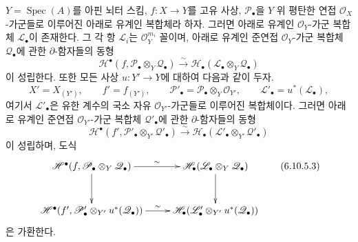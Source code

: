 \begin{theorem}[6.10.5]
\label{III.6.10.5-fr}
$Y=\operatorname{Spec}(A)$를 아핀 뇌터 스킴,
$f:X\to Y$를 고유 사상, $\mathscr P_\bullet$을 $Y$ 위 평탄한 연접
$\mathscr O_X$-가군들로 이루어진 아래로 유계인 복합체라 하자.
그러면 아래로 유계인 $\mathscr O_Y$-가군 복합체
$\mathscr L_\bullet$이 존재한다. 그 각 항 $\mathscr L_i$는
$\mathscr O_Y^{m_i}$ 꼴이며, 아래로 유계인 준연접
$\mathscr O_Y$-가군 복합체 $\mathscr Q_\bullet$에 관한
$\partial$-함자들의 동형
\[
  \mathscr H^\bullet
  (f,\mathscr P_\bullet\otimes_Y\mathscr Q_\bullet)
  \xrightarrow{\sim}
  \mathscr H_\bullet
  (\mathscr L_\bullet\otimes_Y\mathscr Q_\bullet)
  \tag{6.10.5.1}\label{III.6.10.5.1.fr}
\]
이 성립한다. 또한 모든 사상 $u:Y'\to Y$에 대하여 다음과 같이
두자.
\[
  X'=X_{(Y')},
  \qquad
  f'=f_{(Y')},
  \qquad
  \mathscr P'_\bullet
  =
  \mathscr P_\bullet\otimes_Y\mathscr O_{Y'},
  \qquad
  \mathscr L'_\bullet=u^*(\mathscr L_\bullet),
\]
여기서 $\mathscr L'_\bullet$은 유한 계수의 국소 자유
$\mathscr O_{Y'}$-가군들로 이루어진 복합체이다. 그러면 아래로
유계인 준연접 $\mathscr O_{Y'}$-가군 복합체
$\mathscr Q'_\bullet$에 관한 $\partial$-함자들의 동형
\[
  \mathscr H^\bullet
  (f',\mathscr P'_\bullet\otimes_{Y'}\mathscr Q'_\bullet)
  \xrightarrow{\sim}
  \mathscr H_\bullet
  (\mathscr L'_\bullet\otimes_{Y'}\mathscr Q'_\bullet)
  \tag{6.10.5.2}\label{III.6.10.5.2.fr}
\]
이 성립하며, 도식
\[
\xymatrix@C=25pt@R=30pt{
  \mathscr H^\bullet
  (f,\mathscr P_\bullet\otimes_Y\mathscr Q_\bullet)
  \ar[r]^-{\sim}\ar[d]
  &
  \mathscr H_\bullet
  (\mathscr L_\bullet\otimes_Y\mathscr Q_\bullet)
  \ar[d]
  \\
  \mathscr H^\bullet
  (f',\mathscr P'_\bullet\otimes_{Y'}u^*(\mathscr Q_\bullet))
  \ar[r]^-{\sim}
  &
  \mathscr H_\bullet
  (\mathscr L'_\bullet\otimes_{Y'}u^*(\mathscr Q_\bullet))
}
\tag{6.10.5.3}\label{III.6.10.5.3.fr}
\]
은 가환한다.
\end{theorem}


